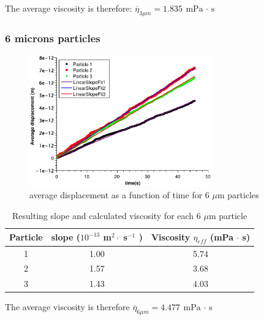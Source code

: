 \documentclass{article}
\begin{document}
The average viscosity is therefore: $\boxed{\overline{\eta}_{3\mu m} = 1.835 \ \text{mPa $\cdot$ s}}$ 


\subsubsection{6 microns particles}
\begin{figure}[H]
    \centering
    \includegraphics[width=0.7\textwidth]{qti/6microns.eps}
    \caption{average displacement as a function of time for 6 $\mu$m particles}
    \label{fig:6microns}
\end{figure}

\begin{table}[H]
    \centering
    \begin{tabular}{c|c|c}
       Particle  & slope ($10^{-13}$ m$^2 \cdot$ s$^{-1}$ ) & Viscosity $\eta_{eff}$ (mPa $\cdot$ s) \\
       \hline
        1 & 1.00 & 5.74\\
        2 & 1.57 & 3.68 \\
        3 & 1.43 & 4.03
    \end{tabular}
    \caption{Resulting slope and calculated viscosity for each 6 $\mu$m particle }
    \label{tab:viscosity6micron}
\end{table}

The average viscosity is therefore $\boxed{\overline{\eta}_{6\mu m} = 4.477 \ \text{mPa $\cdot$ s}}$ 
\end{document}
